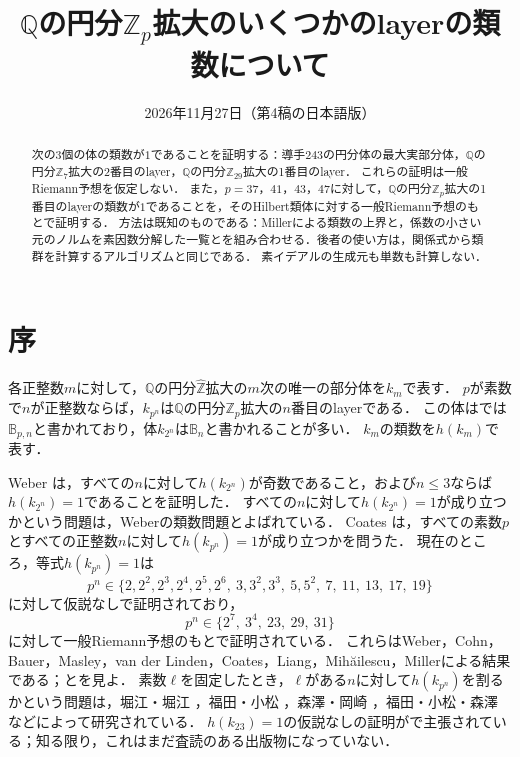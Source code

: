 \documentclass[11pt,a4paper]{ltjsarticle}
\title{$\mathbb{Q}$の円分$\mathbb{Z}_p$拡大のいくつかのlayerの類数について}
\author{}   %
\date{2026年11月27日（第4稿の日本語版）}
\theoremstyle{ja}
\begin{document}
\maketitle

\begin{abstract}
次の3個の体の類数が$1$であることを証明する：導手$243$の円分体の最大実部分体，$\mathbb{Q}$の円分$\mathbb{Z}_7$拡大の2番目のlayer，$\mathbb{Q}$の円分$\mathbb{Z}_{29}$拡大の1番目のlayer．
これらの証明は一般Riemann予想を仮定しない．
また，$p = 37$，$41$，$43$，$47$に対して，$\mathbb{Q}$の円分$\mathbb{Z}_p$拡大の1番目のlayerの類数が$1$であることを，そのHilbert類体に対する一般Riemann予想のもとで証明する．
方法は既知のものである：Millerによる類数の上界と，係数の小さい元のノルムを素因数分解した一覧とを組み合わせる．後者の使い方は，関係式から類群を計算するアルゴリズムと同じである．
素イデアルの生成元も単数も計算しない．
\end{abstract}

\section{序}

各正整数$m$に対して，$\mathbb{Q}$の円分$\hat{\mathbb{Z}}$拡大の$m$次の唯一の部分体を$k_m$で表す．
$p$が素数で$n$が正整数ならば，$k_{p^n}$は$\mathbb{Q}$の円分$\mathbb{Z}_p$拡大の$n$番目のlayerである．
この体は\cite{Mi15b}では$\mathbb{B}_{p,n}$と書かれており，体$k_{2^n}$は$\mathbb{B}_n$と書かれることが多い．
$k_m$の類数を$h(k_m)$で表す．

Weber \cite{We86}は，すべての$n$に対して$h(k_{2^n})$が奇数であること，および$n \le 3$ならば$h(k_{2^n}) = 1$であることを証明した．
すべての$n$に対して$h(k_{2^n}) = 1$が成り立つかという問題は，Weberの類数問題とよばれている．
Coates \cite{Co12}は，すべての素数$p$とすべての正整数$n$に対して$h(k_{p^n}) = 1$が成り立つかを問うた．
現在のところ，等式$h(k_{p^n}) = 1$は
\[
p^n \in \{2, 2^2, 2^3, 2^4, 2^5, 2^6,\ 3, 3^2, 3^3,\ 5, 5^2,\ 7,\ 11,\ 13,\ 17,\ 19\}
\]
に対して仮説なしで証明されており，
\[
p^n \in \{2^7,\ 3^4,\ 23,\ 29,\ 31\}
\]
に対して一般Riemann予想のもとで証明されている．
これらはWeber，Cohn，Bauer，Masley，van der Linden，Coates，Liang，Mih\u{a}ilescu，Millerによる結果である；\cite[Table 1, Theorem 7, Table 2]{Mi15b}と\cite{Co60, Ba69, Ma78, vdL82, Co12, Mi14, Mi14b}を見よ．
素数$\ell$を固定したとき，$\ell$がある$n$に対して$h(k_{p^n})$を割るかという問題は，堀江・堀江 \cite{HH09}，福田・小松 \cite{FK11}，森澤・岡崎 \cite{MO13}，福田・小松・森澤 \cite{FKM14}などによって研究されている．
$h(k_{23}) = 1$の仮説なしの証明が\cite{Ch26}で主張されている；知る限り，これはまだ査読のある出版物になっていない．
\end{document}
